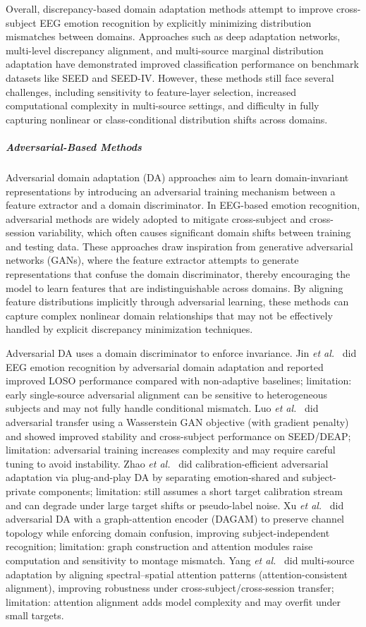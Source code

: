 \documentclass{WileyMSP-template}
\begin{document}
Overall, discrepancy-based domain adaptation methods attempt to improve cross-subject EEG emotion recognition by explicitly minimizing distribution mismatches between domains. Approaches such as deep adaptation networks, multi-level discrepancy alignment, and multi-source marginal distribution adaptation have demonstrated improved classification performance on benchmark datasets like SEED and SEED-IV. However, these methods still face several challenges, including sensitivity to feature-layer selection, increased computational complexity in multi-source settings, and difficulty in fully capturing nonlinear or class-conditional distribution shifts across domains.
\subparagraph{Adversarial-Based Methods}
Adversarial domain adaptation (DA) approaches aim to learn domain-invariant representations by introducing an adversarial training mechanism between a feature extractor and a domain discriminator. In EEG-based emotion recognition, adversarial methods are widely adopted to mitigate cross-subject and cross-session variability, which often causes significant domain shifts between training and testing data. These approaches draw inspiration from generative adversarial networks (GANs), where the feature extractor attempts to generate representations that confuse the domain discriminator, thereby encouraging the model to learn features that are indistinguishable across domains. By aligning feature distributions implicitly through adversarial learning, these methods can capture complex nonlinear domain relationships that may not be effectively handled by explicit discrepancy minimization techniques.

Adversarial DA uses a domain discriminator to enforce invariance. Jin \textit{et al.}~\cite{jin2017eegdan} did EEG emotion recognition by adversarial domain adaptation and reported improved LOSO performance compared with non-adaptive baselines; limitation: early single-source adversarial alignment can be sensitive to heterogeneous subjects and may not fully handle conditional mismatch. Luo \textit{et al.}~\cite{luo2018iconip_wganda} did adversarial transfer using a Wasserstein GAN objective (with gradient penalty) and showed improved stability and cross-subject performance on SEED/DEAP; limitation: adversarial training increases complexity and may require careful tuning to avoid instability. Zhao \textit{et al.}~\cite{zhao2021aaai_ppda} did calibration-efficient adversarial adaptation via plug-and-play DA by separating emotion-shared and subject-private components; limitation: still assumes a short target calibration stream and can degrade under large target shifts or pseudo-label noise. Xu \textit{et al.}~\cite{xu2023dagam} did adversarial DA with a graph-attention encoder (DAGAM) to preserve channel topology while enforcing domain confusion, improving subject-independent recognition; limitation: graph construction and attention modules raise computation and sensitivity to montage mismatch. Yang \textit{et al.}~\cite{yang2024ssaamsda} did multi-source adaptation by aligning spectral--spatial attention patterns (attention-consistent alignment), improving robustness under cross-subject/cross-session transfer; limitation: attention alignment adds model complexity and may overfit under small targets.
\end{document}
